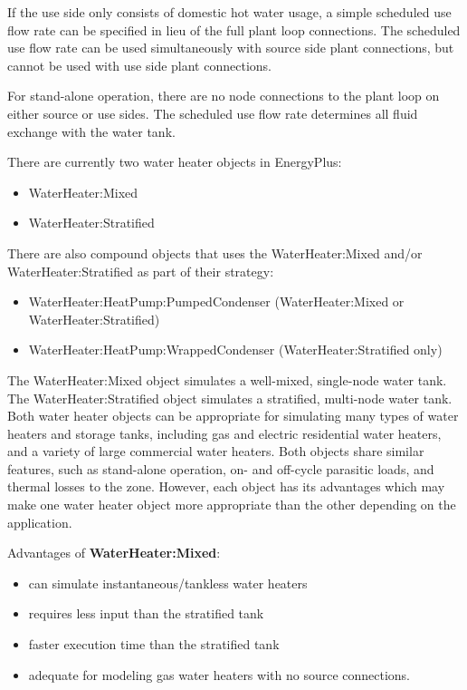 If the use side only consists of domestic hot water usage, a simple scheduled use flow rate can be specified in lieu of the full plant loop connections. The scheduled use flow rate can be used simultaneously with source side plant connections, but cannot be used with use side plant connections.

For stand-alone operation, there are no node connections to the plant loop on either source or use sides. The scheduled use flow rate determines all fluid exchange with the water tank.

There are currently two water heater objects in EnergyPlus:

\begin{itemize}
\item
  WaterHeater:Mixed
\item
  WaterHeater:Stratified
\end{itemize}

There are also compound objects that uses the WaterHeater:Mixed and/or WaterHeater:Stratified as part of their strategy:

\begin{itemize}
\tightlist
\item
  WaterHeater:HeatPump:PumpedCondenser (WaterHeater:Mixed or WaterHeater:Stratified)
\item
  WaterHeater:HeatPump:WrappedCondenser (WaterHeater:Stratified only)
\end{itemize}

The WaterHeater:Mixed object simulates a well-mixed, single-node water tank. The WaterHeater:Stratified object simulates a stratified, multi-node water tank. Both water heater objects can be appropriate for simulating many types of water heaters and storage tanks, including gas and electric residential water heaters, and a variety of large commercial water heaters. Both objects share similar features, such as stand-alone operation, on- and off-cycle parasitic loads, and thermal losses to the zone. However, each object has its advantages which may make one water heater object more appropriate than the other depending on the application.

Advantages of \textbf{WaterHeater:Mixed}:

\begin{itemize}
\item
  can simulate instantaneous/tankless water heaters
\item
  requires less input than the stratified tank
\item
  faster execution time than the stratified tank
\item
  adequate for modeling gas water heaters with no source connections.
\end{itemize}

